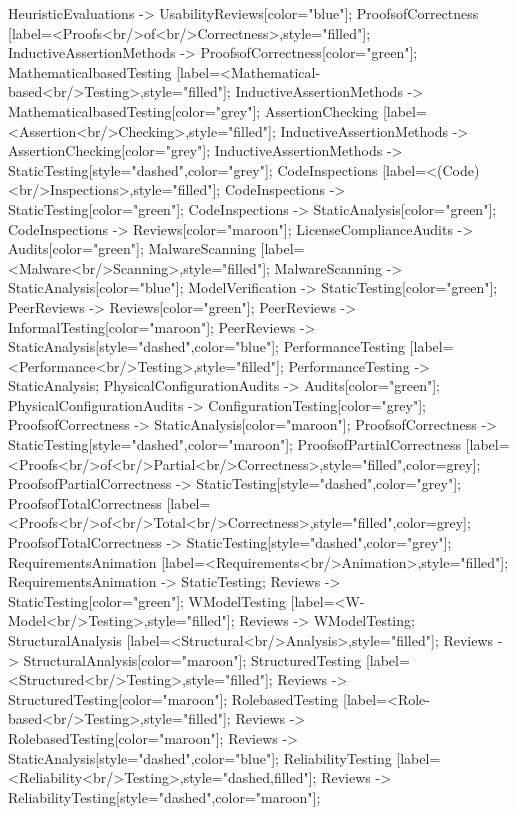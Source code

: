 \documentclass{article}
\begin{document}
{HeuristicEvaluations -> UsabilityReviews[color="blue"];
ProofsofCorrectness [label=<Proofs<br/>of<br/>Correctness>,style="filled"];
InductiveAssertionMethods -> ProofsofCorrectness[color="green"];
MathematicalbasedTesting [label=<Mathematical-based<br/>Testing>,style="filled"];
InductiveAssertionMethods -> MathematicalbasedTesting[color="grey"];
AssertionChecking [label=<Assertion<br/>Checking>,style="filled"];
InductiveAssertionMethods -> AssertionChecking[color="grey"];
InductiveAssertionMethods -> StaticTesting[style="dashed",color="grey"];
CodeInspections [label=<(Code)<br/>Inspections>,style="filled"];
CodeInspections -> StaticTesting[color="green"];
CodeInspections -> StaticAnalysis[color="green"];
CodeInspections -> Reviews[color="maroon"];
LicenseComplianceAudits -> Audits[color="green"];
MalwareScanning [label=<Malware<br/>Scanning>,style="filled"];
MalwareScanning -> StaticAnalysis[color="blue"];
ModelVerification -> StaticTesting[color="green"];
PeerReviews -> Reviews[color="green"];
PeerReviews -> InformalTesting[color="maroon"];
PeerReviews -> StaticAnalysis[style="dashed",color="blue"];
PerformanceTesting [label=<Performance<br/>Testing>,style="filled"];
PerformanceTesting -> StaticAnalysis;
PhysicalConfigurationAudits -> Audits[color="green"];
PhysicalConfigurationAudits -> ConfigurationTesting[color="grey"];
ProofsofCorrectness -> StaticAnalysis[color="maroon"];
ProofsofCorrectness -> StaticTesting[style="dashed",color="maroon"];
ProofsofPartialCorrectness [label=<Proofs<br/>of<br/>Partial<br/>Correctness>,style="filled",color=grey];
ProofsofPartialCorrectness -> StaticTesting[style="dashed",color="grey"];
ProofsofTotalCorrectness [label=<Proofs<br/>of<br/>Total<br/>Correctness>,style="filled",color=grey];
ProofsofTotalCorrectness -> StaticTesting[style="dashed",color="grey"];
RequirementsAnimation [label=<Requirements<br/>Animation>,style="filled"];
RequirementsAnimation -> StaticTesting;
Reviews -> StaticTesting[color="green"];
WModelTesting [label=<W-Model<br/>Testing>,style="filled"];
Reviews -> WModelTesting;
StructuralAnalysis [label=<Structural<br/>Analysis>,style="filled"];
Reviews -> StructuralAnalysis[color="maroon"];
StructuredTesting [label=<Structured<br/>Testing>,style="filled"];
Reviews -> StructuredTesting[color="maroon"];
RolebasedTesting [label=<Role-based<br/>Testing>,style="filled"];
Reviews -> RolebasedTesting[color="maroon"];
Reviews -> StaticAnalysis[style="dashed",color="blue"];
ReliabilityTesting [label=<Reliability<br/>Testing>,style="dashed,filled"];
Reviews -> ReliabilityTesting[style="dashed",color="maroon"];
}
\end{document}

